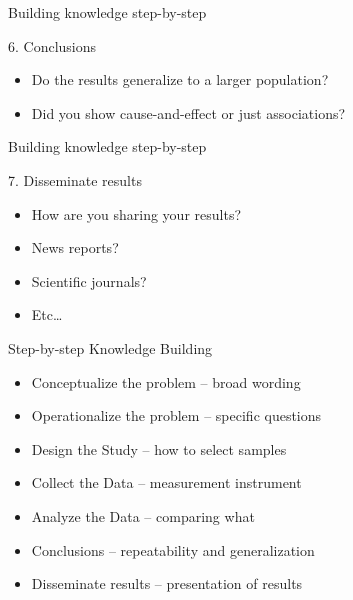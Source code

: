 \documentclass[14pt]{beamer}\usepackage[]{graphicx}\usepackage[]{color}
\begin{document}
\begin{frame}[fragile]{Building knowledge step-by-step}

6. Conclusions

\begin{itemize}
\item Do the results generalize to a larger population?
\item Did you show cause-and-effect or just associations?
\end{itemize}
\end{frame}

\begin{frame}[fragile]{Building knowledge step-by-step}

7. Disseminate results

\begin{itemize}
\item How are you sharing your results?  
\item News reports? 
\item Scientific journals? 
\item Etc…
\end{itemize}
\end{frame}

\begin{frame}[fragile]{Step-by-step Knowledge Building }

\begin{itemize}
\item Conceptualize the problem -- broad wording
\item Operationalize the problem -- specific questions
\item Design the Study -- how to select samples
\item Collect the Data -- measurement instrument
\item Analyze the Data -- comparing what
\item Conclusions -- repeatability and generalization
\item Disseminate results -- presentation of results
\end{itemize}
\end{frame}
\end{document}

